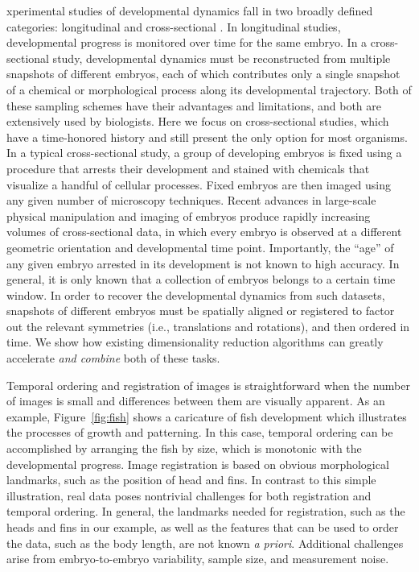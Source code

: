 \documentclass{pnastwo}
\begin{document}
\begin{article}
xperimental studies of developmental dynamics fall in two broadly defined categories: longitudinal and cross-sectional \cite{diggle2002analysis}.
%
In longitudinal studies, developmental progress is monitored over time for the same embryo.
%
In a cross-sectional study, developmental dynamics must be reconstructed from multiple snapshots of different embryos, each of which contributes only a single snapshot of a chemical or morphological process along its developmental trajectory.
%
Both of these sampling schemes have their advantages and limitations, and both are extensively used by biologists.
%
Here we focus on cross-sectional studies, which have a time-honored history and still present the only option for most organisms.
%
In a typical cross-sectional study, a group of developing embryos is fixed using a procedure that arrests their development and stained with chemicals that visualize a handful of cellular processes.
%
Fixed embryos are then imaged using any given number of microscopy techniques.
%
Recent advances in large-scale physical manipulation and imaging of embryos produce rapidly increasing volumes of cross-sectional data, in which every embryo is observed at a different geometric orientation and developmental time point.
%
Importantly, the ``age'' of any given embryo arrested in its development is not known to high accuracy.
%
In general, it is only known that a collection of embryos belongs to a certain time window.
%
In order to recover the developmental dynamics from such datasets, snapshots of different embryos must be spatially aligned or registered to factor out the relevant symmetries (i.e., translations and rotations), and then ordered in time.
%
We show how existing dimensionality reduction algorithms can greatly accelerate {\it and combine} both of these tasks.

Temporal ordering and registration of images is straightforward when the number of images is small and differences between them are visually apparent.
%
As an example, Figure~\ref{fig:fish} shows a caricature of fish development which illustrates the processes of growth and patterning.
%
In this case, temporal ordering can be accomplished by arranging the fish by size, which is monotonic with the developmental progress.
%
Image registration is based on obvious morphological landmarks, such as the position of head and fins.
%
In contrast to this simple illustration, real data poses nontrivial challenges for both registration and temporal ordering. 
%
In general, the landmarks needed for registration, such as the heads and fins in our example, as well as the features that can be used to order the data, such as the body length, are not known {\it a priori}.
%
Additional challenges arise from embryo-to-embryo variability, sample size, and measurement noise. 


\end{article}
\end{document}
